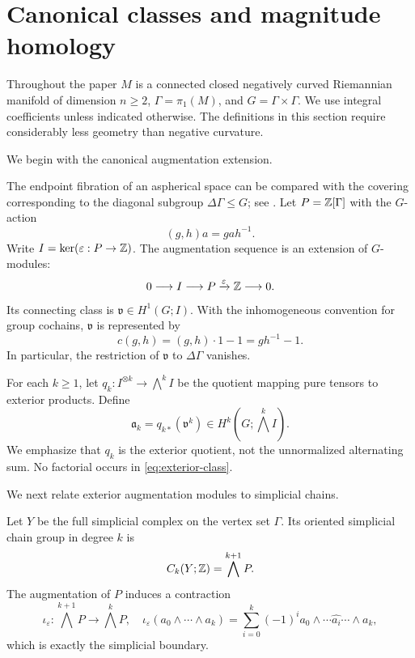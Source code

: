 \section{Canonical classes and magnitude homology}
\label{sec:canonical}

Throughout the paper $M$ is a connected closed negatively curved
Riemannian manifold of dimension $n\geq2$, $\Gamma=\pi_1(M)$, and
$G=\Gamma\times\Gamma$. We use integral coefficients unless indicated
otherwise. The definitions in this section require considerably less
geometry than negative curvature.

We begin with the canonical augmentation extension.

The endpoint fibration of an aspherical space can be compared with
the covering corresponding to the diagonal subgroup
$\Delta\Gamma\leq G$; see \cite{CostaFarber2010}.
Let $P=\mathbb{Z}[\Gamma]$ with the $G$-action
\[
 (g,h)a=gah^{-1}.
\]
Write $I=\ker(\varepsilon:P\to\mathbb{Z})$.
The augmentation sequence is an extension of $G$-modules:
\begin{equation}\label{eq:augmentation}
 0\longrightarrow I\longrightarrow P
 \xrightarrow{\varepsilon}\mathbb{Z}\longrightarrow0.
\end{equation}
Its connecting class is
$\mathfrak v\in H^1(G;I)$. With the inhomogeneous convention
for group cochains, $\mathfrak v$ is represented by
\begin{equation}\label{eq:canonical-cocycle}
 c(g,h)=(g,h)\cdot1-1=gh^{-1}-1.
\end{equation}
In particular, the restriction of $\mathfrak v$ to
$\Delta\Gamma$ vanishes.

For each $k\geq1$, let
$q_k:I^{\otimes k}\to\bigwedge^k I$ be the quotient
mapping pure tensors to exterior products. Define
\begin{equation}\label{eq:exterior-class}
 \mathfrak a_k=q_{k*}(\mathfrak v^k)
 \in H^k(G;\bigwedge^k I).
\end{equation}
We emphasize that $q_k$ is the exterior quotient, not the
unnormalized alternating sum. No factorial occurs in
\eqref{eq:exterior-class}.

We next relate exterior augmentation modules to simplicial chains.

Let $Y$ be the full simplicial complex on the vertex set $\Gamma$.
Its oriented simplicial chain group in degree $k$ is
\[
 C_k(Y;\mathbb{Z})=\bigwedge^{k+1}P.
\]
The augmentation of $P$ induces a contraction
\[
 \iota_\varepsilon:\bigwedge^{k+1}P
 \longrightarrow\bigwedge^kP,\quad
 \iota_\varepsilon(a_0\wedge\cdots\wedge a_k)
 =\sum_{i=0}^{k}(-1)^i
   a_0\wedge\cdots\widehat{a_i}\cdots\wedge a_k,
\]
which is exactly the simplicial boundary.

